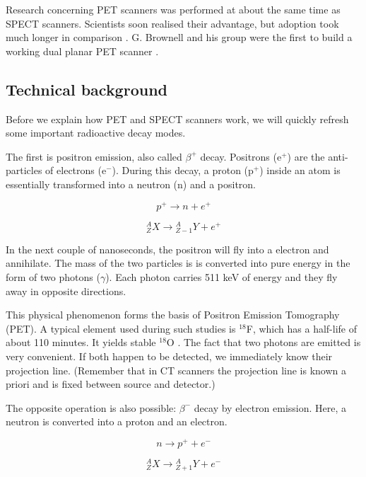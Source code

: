 Research concerning PET scanners was performed at about the same time
as SPECT scanners. Scientists soon realised their advantage, but adoption took
much longer in comparison \cite{petreview}. G. Brownell and his group were the
first to build a working dual planar PET scanner \cite{brownell}.

\subsection{Technical background}
Before we explain how PET and SPECT scanners work, we will quickly refresh some
important radioactive decay modes.

The first is positron emission, also called $\beta^+$ decay. Positrons (e$^+$)
are the anti-particles of electrons (e$^-$). During this decay, a proton (p$^+$)
inside an atom is essentially transformed into a neutron (n) and a positron.

\begin{equation}
	p^+ \rightarrow n + e^+
\end{equation}

\begin{equation}
	{}_Z^AX \rightarrow {}_{Z-1}^AY + e^+
\end{equation}

In the next couple of nanoseconds, the positron will fly into a electron and
annihilate. The mass of the two particles is is converted into pure energy in
the form of two photons ($\gamma$). Each photon carries 511 keV of energy and
they fly away in opposite directions.

This physical phenomenon forms the basis of Positron Emission Tomography (PET).
A typical element used during such studies is $^{18}$F, which has a half-life of
about 110 minutes. It yields stable $^{18}$O \cite{suetens}. The fact that two
photons are emitted is very convenient. If both happen to be detected, we
immediately know their projection line. (Remember that in CT scanners the
projection line is known a priori and is fixed between source and detector.)

The opposite operation is also possible: $\beta^-$ decay by electron emission.
Here, a neutron is converted into a proton and an electron.

\begin{equation}
	n \rightarrow p^+ + e^-
\end{equation}

\begin{equation}
	{}_Z^AX \rightarrow {}_{Z+1}^AY + e^-
\end{equation}

